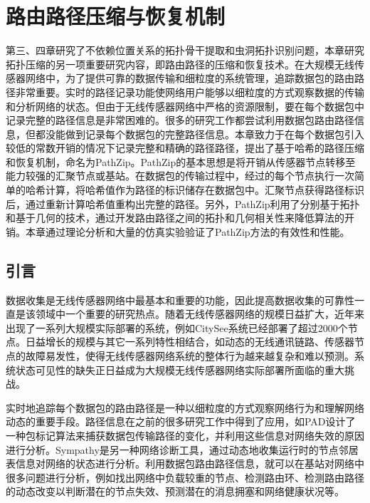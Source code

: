 \chapter{路由路径压缩与恢复机制}
\label{chap:5}
第三、四章研究了不依赖位置关系的拓扑骨干提取和虫洞拓扑识别问题，本章研究拓扑压缩的另一项重要研究内容，即路由路径的压缩和恢复技术。在大规模无线传感器网络中，为了提供可靠的数据传输和细粒度的系统管理，追踪数据包的路由路径非常重要。实时的路径记录功能使网络用户能够以细粒度的方式观察数据的传输和分析网络的状态。但由于无线传感器网络中严格的资源限制，要在每个数据包中记录完整的路径信息是非常困难的。很多的研究工作都尝试利用数据包路由路径信息，但都没能做到记录每个数据包的完整路径信息。本章致力于在每个数据包引入较低的常数开销的情况下记录完整和精确的路径路径，提出了基于哈希的路径压缩和恢复机制，命名为PathZip。PathZip的基本思想是将开销从传感器节点转移至能力较强的汇聚节点或基站。在数据包的传输过程中，经过的每个节点执行一次简单的哈希计算，将哈希值作为路径的标识储存在数据包中。汇聚节点获得路径标识后，通过重新计算哈希值重构出完整的路径。另外，PathZip利用了分别基于拓扑和基于几何的技术，通过开发路由路径之间的拓扑和几何相关性来降低算法的开销。本章通过理论分析和大量的仿真实验验证了PathZip方法的有效性和性能。
\section{引言}
数据收集是无线传感器网络中最基本和重要的功能，因此提高数据收集的可靠性一直是该领域中一个重要的研究热点。随着无线传感器网络的规模日益扩大，近年来出现了一系列大规模实际部署的系统，例如CitySee系统已经部署了超过2000个节点。日益增长的规模与其它一系列特性相结合，如动态的无线通讯链路、传感器节点的故障易发性，使得无线传感器网络系统的整体行为越来越复杂和难以预测。系统状态可见性的缺失正日益成为大规模无线传感器网络实际部署所面临的重大挑战。

实时地追踪每个数据包的路由路径是一种以细粒度的方式观察网络行为和理解网络动态的重要手段。路径信息在之前的很多研究工作中得到了应用，如PAD设计了一种包标记算法来捕获数据包传输路径的变化，并利用这些信息对网络失效的原因进行分析。Sympathy是另一种网络诊断工具，通过动态地收集运行时的节点邻居表信息对网络的状态进行分析。利用数据包路由路径信息，就可以在基站对网络中很多问题进行分析，例如找出网络中负载较重的节点、检测路由环、检测路由路径的动态改变以判断潜在的节点失效、预测潜在的消息拥塞和网络健康状况等。

